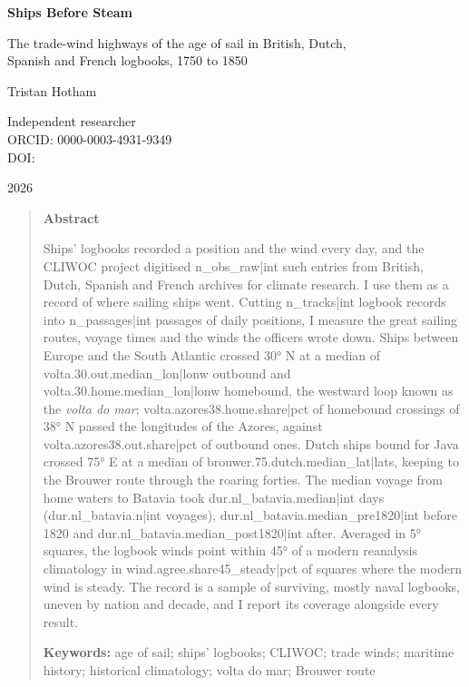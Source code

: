 \documentclass[11pt,a4paper]{article}
\begin{document}
\begin{center}
{\Large\bfseries Ships Before Steam\par}
\vspace{0.4em}
{\large The trade-wind highways of the age of sail in British, Dutch,\\Spanish and French logbooks, 1750 to 1850\par}
\vspace{1.2em}
{\large Tristan Hotham\par}
\vspace{0.3em}
{\small Independent researcher\\
ORCID: 0000-0003-4931-9349\\
DOI: \par}
\vspace{0.8em}
2026
\end{center}

\begin{quote}
\small
\begin{center}\textbf{Abstract}\end{center}
Ships' logbooks recorded a position and the wind every day, and the CLIWOC project digitised {{n_obs_raw|int}} such entries from British, Dutch, Spanish and French archives for climate research. I use them as a record of where sailing ships went. Cutting {{n_tracks|int}} logbook records into {{n_passages|int}} passages of daily positions, I measure the great sailing routes, voyage times and the winds the officers wrote down. Ships between Europe and the South Atlantic crossed 30° N at a median of {{volta.30.out.median_lon|lonw}} outbound and {{volta.30.home.median_lon|lonw}} homebound, the westward loop known as the \emph{volta do mar}; {{volta.azores38.home.share|pct}} of homebound crossings of 38° N passed the longitudes of the Azores, against {{volta.azores38.out.share|pct}} of outbound ones. Dutch ships bound for Java crossed 75° E at a median of {{brouwer.75.dutch.median_lat|lats}}, keeping to the Brouwer route through the roaring forties. The median voyage from home waters to Batavia took {{dur.nl_batavia.median|int}} days ({{dur.nl_batavia.n|int}} voyages), {{dur.nl_batavia.median_pre1820|int}} before 1820 and {{dur.nl_batavia.median_post1820|int}} after. Averaged in 5° squares, the logbook winds point within 45° of a modern reanalysis climatology in {{wind.agree.share45_steady|pct}} of squares where the modern wind is steady. The record is a sample of surviving, mostly naval logbooks, uneven by nation and decade, and I report its coverage alongside every result.

\textbf{Keywords:} age of sail; ships' logbooks; CLIWOC; trade winds; maritime history; historical climatology; volta do mar; Brouwer route
\end{quote}
\end{document}
